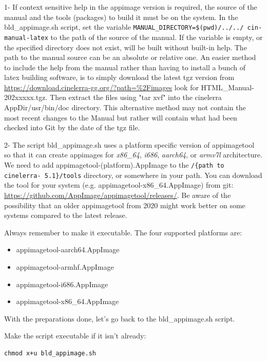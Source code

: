 1- If context sensitive help in the appimage version is required, the source of the manual and the tools (packages) to build it must be on the system. In the bld\_appimage.sh script, set the variable \texttt{MANUAL\_DIRECTORY=\$(pwd)/../../ cin-manual-latex} to the path of the source of the manual. If the variable is empty, or the specified directory does not exist, \CGG{} will be built without built-in help. The path to the manual source can be an absolute or relative one. An easier method to include the help from the manual rather than having to install a bunch of latex building software, is to simply download the latest tgz version from {\small\url{https://download.cinelerra-gg.org/?path=\%2Fimages} look for HTML\_Manual-202xxxxx.tgz}.
Then extract the files using "tar xvf" into the cinelerra AppDir/usr/bin/doc directory.
This alternative method may not contain the most recent changes to the Manual but rather will contain what had been checked into Git by the date of the tgz file.

2- The script bld\_appimage.sh uses a platform specific version of appimagetool so that it can create appimages for \textit{x86\_64}, \textit{i686}, \textit{aarch64}, or \textit{armv7l} architecture. We need to add appimagetool-(platform).AppImage to the \texttt{/\{path to cinelerra- 5.1\}/tools} directory, or somewhere in your path. You can download the tool for your system (e.g. appimagetool-x86\_64.AppImage) from git: {\small\url{https://github.com/AppImage/appimagetool/releases/}}. Be aware of the possibility that an older appimagetool from 2020 might work better on some systems compared to the latest release.

Always remember to make it executable. The four supported platforms are:

\begin{itemize}
	\item appimagetool-aarch64.AppImage
	\item appimagetool-armhf.AppImage
	\item appimagetool-i686.AppImage
	\item appimagetool-x86\_64.AppImage
\end{itemize}

With the preparations done, let's go back to the bld\_appimage.sh script.

Make the script executable if it isn't already:

\begin{lstlisting}[numbers=none]
chmod x+u bld_appimage.sh
\end{lstlisting}


